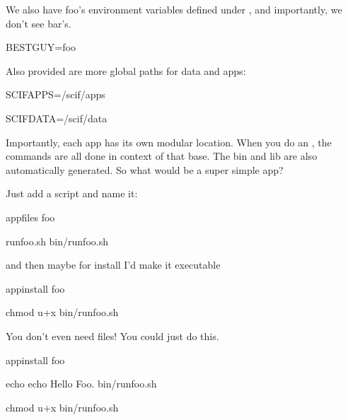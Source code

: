 \documentclass[letterpaper,10pt,english]{sphinxmanual}
\begin{document}
We also have foo’s environment variables defined under  , and
importantly, we don’t see bar’s.

%
\begin{sphinxVerbatim}[commandchars=\\\{\}]
BEST\PYGZus{}GUY=foo
\end{sphinxVerbatim}

Also provided are more global paths for data and apps:

%
\begin{sphinxVerbatim}[commandchars=\\\{\}]
SCIF\PYGZus{}APPS=/scif/apps

SCIF\PYGZus{}DATA=/scif/data
\end{sphinxVerbatim}

Importantly, each app has its own modular location. When you do an ,
the commands are all done in context of that base. The bin and lib are
also automatically generated. So what would be a super simple app?

Just add a script and name it:

%
\begin{sphinxVerbatim}[commandchars=\\\{\}]
\PYGZpc{}appfiles foo

    runfoo.sh   bin/runfoo.sh
\end{sphinxVerbatim}

and then maybe for install I’d make it executable

%
\begin{sphinxVerbatim}[commandchars=\\\{\}]
\PYGZpc{}appinstall foo

    chmod u+x bin/runfoo.sh
\end{sphinxVerbatim}

You don’t even need files! You could just do this.

%
\begin{sphinxVerbatim}[commandchars=\\\{\}]
\PYGZpc{}appinstall foo

    echo \PYGZsq{}echo \PYGZdq{}Hello Foo.\PYGZdq{}\PYGZsq{} \PYGZgt{}\PYGZgt{} bin/runfoo.sh

    chmod u+x bin/runfoo.sh
\end{sphinxVerbatim}
\end{document}
